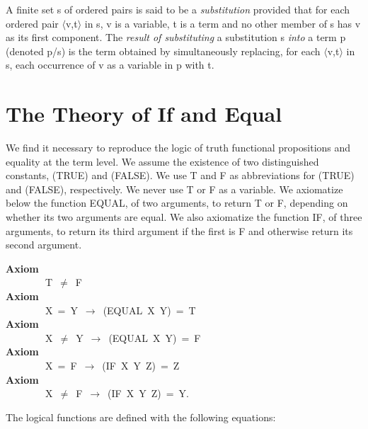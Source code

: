 \documentclass[10pt]{book}
\newenvironment{pubasis}{\begin{flushleft}}{\end{flushleft}}
\newcommand{\axiomordefinition}[1]{\vspace{6pt}\Large\textsf{\textbf{#1}}\normalsize}
\begin{document}
A finite set s of ordered pairs is said to be a \emph{substitution}
provided that for each ordered pair $\langle$v,t$\rangle$ in s, v is a variable, t is
a term and no other member of s has v as its first component.
The \emph{result of substituting} a substitution s \emph{into} a term p
(denoted p/s) is the term obtained by simultaneously replacing, for
each $\langle$v,t$\rangle$ in s, each occurrence of v as a variable in p with t.

\hrulefill 

\section{The Theory of If and Equal}

\hrulefill 

We find it necessary to reproduce the logic
of truth functional propositions and equality at the term level.  We
assume the existence of two distinguished constants, (TRUE) and (FALSE).  We
use T and F as abbreviations for (TRUE) and (FALSE), respectively.
We  never use T or F as a variable.
We axiomatize below the function EQUAL, of two arguments,
to return T or F, depending on whether its two
arguments are equal.
We also axiomatize the function IF, of three arguments, to return
its third argument if the first is F and otherwise return its second
argument.

\begin{pubasis}
\axiomordefinition{Axiom}\\
~~~~~~~~T~$\neq$~F\\

\axiomordefinition{Axiom}\\
~~~~~~~~X~=~Y~$\rightarrow$~(EQUAL~X~Y)~=~T\\

\axiomordefinition{Axiom}\\
~~~~~~~~X~$\neq$~Y~$\rightarrow$~(EQUAL~X~Y)~=~F\\

\axiomordefinition{Axiom}\\
~~~~~~~~X~=~F~$\rightarrow$~(IF~X~Y~Z)~=~Z\\

\axiomordefinition{Axiom}\\
~~~~~~~~X~$\neq$~F~$\rightarrow$~(IF~X~Y~Z)~=~Y.\\
\end{pubasis}
The logical functions
are defined with the following  equations:
\end{document}
